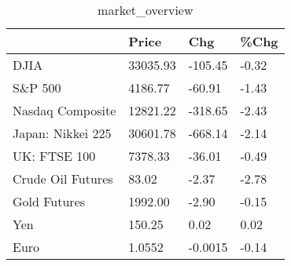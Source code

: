 \documentclass{article}%
\begin{document}
%


\begin{table}[htbp]%
\caption{market\_overview}%
\centering%
\begin{adjustbox}{width=1\textwidth}%
\begin{tabular}{llll}
\toprule
                  &    Price &     Chg &  \%Chg \\
\midrule
             DJIA & 33035.93 & -105.45 & -0.32 \\
          S\&P 500 &  4186.77 &  -60.91 & -1.43 \\
 Nasdaq Composite & 12821.22 & -318.65 & -2.43 \\
Japan: Nikkei 225 & 30601.78 & -668.14 & -2.14 \\
     UK: FTSE 100 &  7378.33 &  -36.01 & -0.49 \\
Crude Oil Futures &    83.02 &   -2.37 & -2.78 \\
     Gold Futures &  1992.00 &   -2.90 & -0.15 \\
              Yen &   150.25 &    0.02 &  0.02 \\
             Euro &   1.0552 & -0.0015 & -0.14 \\
\bottomrule
\end{tabular}
%
\end{adjustbox}%
\end{table}

%
\end{document}
